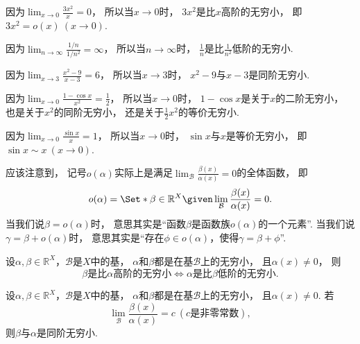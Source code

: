 \begin{example}
因为\(\lim_{x\to0} \frac{3x^2}{x} = 0\)，
所以当\(x\to0\)时，
\(3x^2\)是比\(x\)高阶的无穷小，
即\(3x^2 = o(x)\ (x\to0)\).
\end{example}

\begin{example}
因为\(\lim_{n\to\infty} \frac{1/n}{1/n^2} = \infty\)，
所以当\(n\to\infty\)时，
\(\frac{1}{n}\)是比\(\frac{1}{n^2}\)低阶的无穷小.
\end{example}

\begin{example}
因为\(\lim_{x\to3} \frac{x^2-9}{x-3} = 6\)，
所以当\(x\to3\)时，
\(x^2-9\)与\(x-3\)是同阶无穷小.
\end{example}

\begin{example}
因为\(\lim_{x\to0} \frac{1-\cos x}{x^2} = \frac{1}{2}\)，
所以当\(x\to0\)时，
\(1-\cos x\)是关于\(x\)的二阶无穷小，
也是关于\(x^2\)的同阶无穷小，
还是关于\(\frac12 x^2\)的等价无穷小.
\end{example}

\begin{example}
因为\(\lim_{x\to0} \frac{\sin x}{x} = 1\)，
所以当\(x\to0\)时，
\(\sin x\)与\(x\)是等价无穷小，
即\(\sin x \sim x\ (x\to0)\).
\end{example}

\begin{remark}
应该注意到，
记号\(o(\alpha)\)实际上是满足\(\lim_\mathcal{B} \frac{\beta(x)}{\alpha(x)} = 0\)的全体函数，
即\[
	o(\alpha) = \Set*{ \beta\in\mathbb{R}^X \given \lim_\mathcal{B} \frac{\beta(x)}{\alpha(x)} = 0 }.
\]
当我们说\(\beta = o(\alpha)\)时，
意思其实是“函数\(\beta\)是函数族\(o(\alpha)\)的一个元素”.
当我们说\(\gamma = \beta + o(\alpha)\)时，
意思其实是“存在\(\phi\in o(\alpha)\)，使得\(\gamma = \beta + \phi\)”.
\end{remark}

\begin{proposition}
设\(\alpha,\beta\in\mathbb{R}^X\)，\(\mathcal{B}\)是\(X\)中的基，
\(\alpha\)和\(\beta\)都是在基\(\mathcal{B}\)上的无穷小，
且\(\alpha(x)\neq0\)，
则\[
	\text{\(\beta\)是比\(\alpha\)高阶的无穷小}
	\iff
	\text{\(\alpha\)是比\(\beta\)低阶的无穷小}.
\]
\end{proposition}

\begin{proposition}
设\(\alpha,\beta\in\mathbb{R}^X\)，\(\mathcal{B}\)是\(X\)中的基，
\(\alpha\)和\(\beta\)都是在基\(\mathcal{B}\)上的无穷小，
且\(\alpha(x)\neq0\).
若\[
	\lim_\mathcal{B} \frac{\beta(x)}{\alpha(x)} = c\ (\text{$c$是非零常数}),
\]
则\(\beta\)与\(\alpha\)是同阶无穷小.
\end{proposition}

